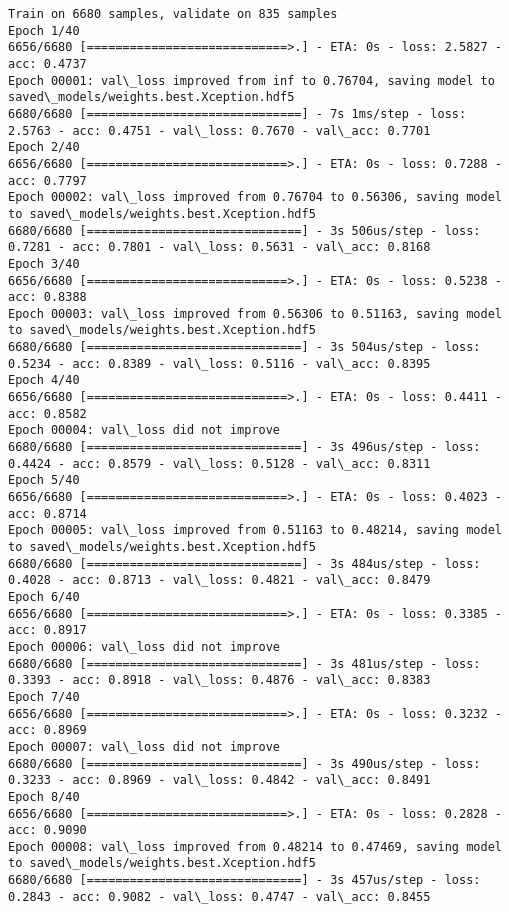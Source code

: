 \documentclass[11pt]{article}
\begin{document}
    \begin{Verbatim}[commandchars=\\\{\}]
Train on 6680 samples, validate on 835 samples
Epoch 1/40
6656/6680 [============================>.] - ETA: 0s - loss: 2.5827 - acc: 0.4737
Epoch 00001: val\_loss improved from inf to 0.76704, saving model to saved\_models/weights.best.Xception.hdf5
6680/6680 [==============================] - 7s 1ms/step - loss: 2.5763 - acc: 0.4751 - val\_loss: 0.7670 - val\_acc: 0.7701
Epoch 2/40
6656/6680 [============================>.] - ETA: 0s - loss: 0.7288 - acc: 0.7797
Epoch 00002: val\_loss improved from 0.76704 to 0.56306, saving model to saved\_models/weights.best.Xception.hdf5
6680/6680 [==============================] - 3s 506us/step - loss: 0.7281 - acc: 0.7801 - val\_loss: 0.5631 - val\_acc: 0.8168
Epoch 3/40
6656/6680 [============================>.] - ETA: 0s - loss: 0.5238 - acc: 0.8388
Epoch 00003: val\_loss improved from 0.56306 to 0.51163, saving model to saved\_models/weights.best.Xception.hdf5
6680/6680 [==============================] - 3s 504us/step - loss: 0.5234 - acc: 0.8389 - val\_loss: 0.5116 - val\_acc: 0.8395
Epoch 4/40
6656/6680 [============================>.] - ETA: 0s - loss: 0.4411 - acc: 0.8582
Epoch 00004: val\_loss did not improve
6680/6680 [==============================] - 3s 496us/step - loss: 0.4424 - acc: 0.8579 - val\_loss: 0.5128 - val\_acc: 0.8311
Epoch 5/40
6656/6680 [============================>.] - ETA: 0s - loss: 0.4023 - acc: 0.8714
Epoch 00005: val\_loss improved from 0.51163 to 0.48214, saving model to saved\_models/weights.best.Xception.hdf5
6680/6680 [==============================] - 3s 484us/step - loss: 0.4028 - acc: 0.8713 - val\_loss: 0.4821 - val\_acc: 0.8479
Epoch 6/40
6656/6680 [============================>.] - ETA: 0s - loss: 0.3385 - acc: 0.8917
Epoch 00006: val\_loss did not improve
6680/6680 [==============================] - 3s 481us/step - loss: 0.3393 - acc: 0.8918 - val\_loss: 0.4876 - val\_acc: 0.8383
Epoch 7/40
6656/6680 [============================>.] - ETA: 0s - loss: 0.3232 - acc: 0.8969
Epoch 00007: val\_loss did not improve
6680/6680 [==============================] - 3s 490us/step - loss: 0.3233 - acc: 0.8969 - val\_loss: 0.4842 - val\_acc: 0.8491
Epoch 8/40
6656/6680 [============================>.] - ETA: 0s - loss: 0.2828 - acc: 0.9090
Epoch 00008: val\_loss improved from 0.48214 to 0.47469, saving model to saved\_models/weights.best.Xception.hdf5
6680/6680 [==============================] - 3s 457us/step - loss: 0.2843 - acc: 0.9082 - val\_loss: 0.4747 - val\_acc: 0.8455

\end{Verbatim}
\end{document}
